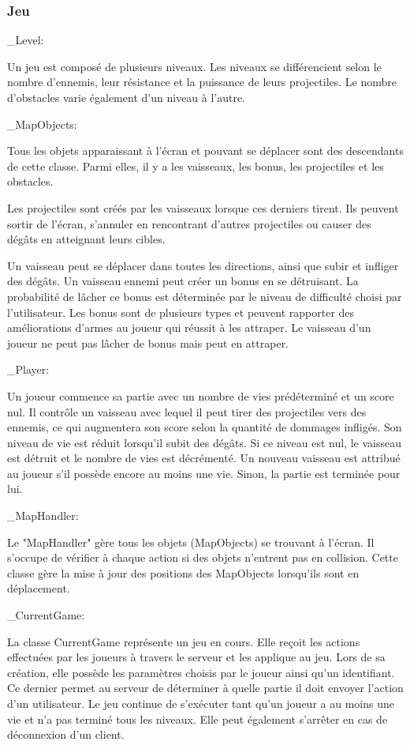\documentclass[a4paper,12pt]{article}
\begin{document}
\subsubsection{Jeu}

\_Level:

Un jeu est composé de plusieurs niveaux. Les niveaux se différencient selon le nombre d'ennemis, leur résistance et la puissance de leurs projectiles. Le nombre d'obstacles varie également d'un niveau à l'autre.

\_MapObjects: 

Tous les objets apparaissant à l'écran et pouvant se déplacer sont des descendants de cette classe. 
Parmi elles, il y a les vaisseaux, les bonus, les projectiles et les obstacles. 

Les projectiles sont créés par les vaisseaux lorsque ces derniers tirent. Ils peuvent sortir de l'écran, s'annuler en rencontrant d'autres projectiles ou causer des dégâts en atteignant leurs cibles. 

Un vaisseau peut se déplacer dans toutes les directions, ainsi que subir et infliger des dégâts.
Un vaisseau ennemi peut créer un bonus en se détruisant. La probabilité de lâcher ce bonus est déterminée par le niveau de difficulté choisi par l'utilisateur. Les bonus sont de plusieurs types et peuvent rapporter des améliorations d'armes au joueur qui réussit à les attraper.
Le vaisseau d'un joueur ne peut pas lâcher de bonus mais peut en attraper.

\_Player:

Un joueur commence sa partie avec un nombre de vies prédéterminé et un score nul. 
Il contrôle un vaisseau avec lequel il peut tirer des projectiles vers des ennemis, ce qui augmentera son score selon la quantité de dommages infligés. Son niveau de vie est réduit lorsqu'il subit des dégâts. Si ce niveau est nul, le vaisseau est détruit et le nombre de vies est décrémenté. Un nouveau vaisseau est attribué au joueur s'il possède encore au moins une vie. Sinon, la partie est terminée pour lui.

\_MapHandler: 

Le "MapHandler" gère tous les objets (MapObjects) se trouvant à l'écran. Il s'occupe de vérifier à chaque action si des objets n'entrent pas en collision. Cette classe gère la mise à jour des positions des MapObjects lorsqu'ils sont en déplacement.

\_CurrentGame:

La classe CurrentGame représente un jeu en cours. Elle reçoit les actions effectuées par les joueurs à travers le serveur et les applique au jeu. 
Lors de sa création, elle possède les paramètres choisis par le joueur ainsi qu'un identifiant. Ce dernier permet au serveur de déterminer à quelle partie il doit envoyer l'action d'un utilisateur. Le jeu continue de s'exécuter tant qu'un joueur a au moins une vie et n'a pas terminé tous les niveaux. Elle peut également s'arrêter en cas de déconnexion d'un client.
\end{document}
